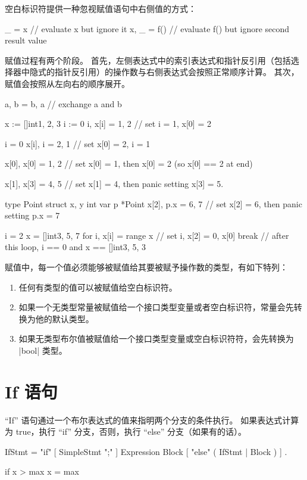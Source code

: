 空白标识符提供一种忽视赋值语句中右侧值的方式：
\begin{golang}
_ = x       // evaluate x but ignore it
x, _ = f()  // evaluate f() but ignore second result value
\end{golang}

赋值过程有两个阶段。
首先，左侧表达式中的索引表达式和指针反引用（包括选择器中隐式的指针反引用）的操作数与右侧表达式会按照正常顺序计算。
其次，赋值会按照从左向右的顺序展开。
\begin{golang}
a, b = b, a  // exchange a and b

x := []int{1, 2, 3}
i := 0
i, x[i] = 1, 2  // set i = 1, x[0] = 2

i = 0
x[i], i = 2, 1  // set x[0] = 2, i = 1

x[0], x[0] = 1, 2  // set x[0] = 1, then x[0] = 2 (so x[0] == 2 at end)

x[1], x[3] = 4, 5  // set x[1] = 4, then panic setting x[3] = 5.

type Point struct { x, y int }
var p *Point
x[2], p.x = 6, 7  // set x[2] = 6, then panic setting p.x = 7

i = 2
x = []int{3, 5, 7}
for i, x[i] = range x {  // set i, x[2] = 0, x[0]
	break
}
// after this loop, i == 0 and x == []int{3, 5, 3}
\end{golang}

赋值中，每一个值必须能够被赋值给其要被赋予操作数的类型，有如下特列：
\begin{enumerate}
\item 任何有类型的值可以被赋值给空白标识符。
\item 如果一个无类型常量被赋值给一个接口类型变量或者空白标识符，常量会先转换为他的默认类型。
\item 如果无类型布尔值被赋值给一个接口类型变量或空白标识符符，会先转换为 \code|bool| 类型。
\end{enumerate}

\section{If 语句}
``If'' 语句通过一个布尔表达式的值来指明两个分支的条件执行。
如果表达式计算为 true，执行 ``if'' 分支，否则，执行 ``else'' 分支（如果有的话）。
\begin{EBNF}
IfStmt = "if" [ SimpleStmt ";" ] Expression Block [ "else" ( IfStmt | Block ) ] .
\end{EBNF}

\begin{golang}
if x > max {
	x = max
}
\end{golang}


